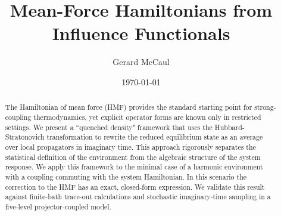 \documentclass[aps,prl,twocolumn,superscriptaddress,showpacs,floatfix]{revtex4-2}
\begin{document}
\title{Mean-Force Hamiltonians from Influence Functionals}
\author{Gerard McCaul}
\date{\today}

\begin{abstract}
The Hamiltonian of mean force (HMF) provides the standard starting point for strong-coupling thermodynamics, yet explicit operator forms are known only in restricted settings. We present a ``quenched density" framework that uses the Hubbard-Stratonovich transformation to rewrite the reduced equilibrium state as an average over local propagators in imaginary time. This approach rigorously separates the statistical definition of the environment from the algebraic structure of the system response. We apply this framework to the minimal case of a harmonic environment with a coupling commuting with the system Hamiltonian. In this scenario the correction to the HMF has an exact, closed-form expression. We validate this result against finite-bath trace-out calculations and stochastic imaginary-time sampling in a five-level projector-coupled model.
\end{abstract}

\maketitle










\end{document}
